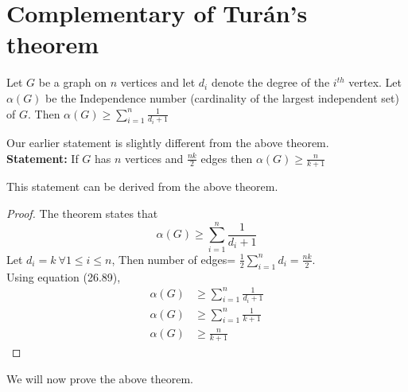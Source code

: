 \section{Complementary of Tur\'an’s theorem}
\begin{theorem}
Let $G$ be a graph on $n$ vertices and let $d_i$ denote the degree of the $i^{th}$ vertex. Let $\alpha(G)$ be the Independence number (cardinality of the largest independent set) of $G$. Then $\alpha(G)\ge \sum_{i=1}^{n}\frac{1}{d_i+1}$ 
\end{theorem}
Our earlier statement is slightly different from the above theorem.\\
\textbf{Statement:} If $G$ has $n$ vertices and $\frac{nk}{2}$ edges then $\alpha(G)\ge \frac{n}{k+1}$
\begin{claim}
This statement can be derived from the above theorem.
\end{claim}
\begin{proof}
The theorem states that 
\begin{equation}
    \alpha(G)\ge \sum_{i=1}^{n}\frac{1}{d_i+1}
\end{equation}
Let $d_i=k~\forall 1\le i\le n$, Then number of edges= $\frac{1}{2}\sum_{i=1}^{n}d_i=\frac{nk}{2}$.\\
Using equation (26.89),
\begin{align*}
    \alpha(G) &\ge \sum_{i=1}^{n}\frac{1}{d_i+1}\\
    \alpha(G) &\ge \sum_{i=1}^{n}\frac{1}{k+1}\\
    \alpha(G) &\ge \frac{n}{k+1}
\end{align*}
\end{proof}
We will now prove the above theorem.

